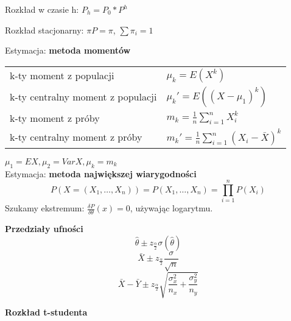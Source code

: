 \documentclass[a4paper]{article}
\begin{document}
    Rozkład w czasie h: $P_h = P_0 * P^h$

    Rozkład stacjonarny: $\pi P = \pi$, $\sum \pi_i = 1$

    Estymacja: \textbf{metoda momentów}

    \begin{table}[H]
        \begin{center}
            \begin{tabular}{ p{} p{}}
                k-ty moment z populacji &
                $\mu_k = E(X^k)$\\

                k-ty centralny moment z populacji &
                $\mu_k' = E((X - \mu_1)^k)$\\

                k-ty moment z próby &
                $m_k = \frac{1}{n} \sum_{i=1}^n X_i^k$\\

                k-ty centralny moment z próby &
                $m_k' = \frac{1}{n} \sum_{i=1}^n (X_i - \bar{X})^k$
            \end{tabular}
        \end{center}
    \end{table}

    $\mu_1 = EX, \mu_2 = VarX, \mu_k = m_k$\\

    Estymacja: \textbf{metoda największej wiarygodności}
    \begin{equation*}
        P(X = (X_1, \dots, X_n)) = P(X_1, \dots, X_n) = \prod_{i=1}^n P(X_i)
    \end{equation*}
    Szukamy ekstremum: $\frac{\delta P}{\delta \theta} (x) = 0$, używając logarytmu.


    \textbf{Przedziały ufności}
    \begin{equation*}
        \hat{\theta} \pm z_{\frac{\alpha}{2}} \sigma(\hat{\theta})
    \end{equation*}
    \begin{equation*}
        \bar{X} \pm z_{\frac{\alpha}{2}} \frac{\sigma}{\sqrt{n}}
    \end{equation*}
    \begin{equation*}
        \bar{X} - \bar{Y} \pm z_{\frac{\alpha}{2}} \sqrt{\frac{\sigma_x^2}{n_x} + \frac{\sigma_y^2}{n_y}}
    \end{equation*}

    \textbf{Rozkład t-studenta}
\end{document}
